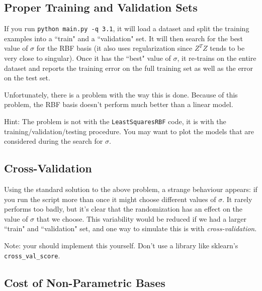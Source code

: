 \documentclass{article}
\begin{document}
\subsection{Proper Training and Validation Sets}

If you run \verb|python main.py -q 3.1|, it will load a dataset and split the training examples
 into a ``train" and a ``validation" set. It will then search for the best value of $\sigma$ 
 for the RBF basis (it also uses regularization since $Z^TZ$ tends to be very close to singular).
  Once it has the ``best" value of $\sigma$, it re-trains on the entire dataset and reports the 
  training error on the full training set as well as the error on the test set.

Unfortunately, there is a problem with the way this is done. Because of this problem, 
the RBF basis doesn't perform much better than a linear model. 

Hint: The problem is not with the \texttt{LeastSquaresRBF} code, it is with the
training/validation/testing procedure.
You may want to plot the models that are considered during the search for $\sigma$.


\subsection{Cross-Validation}

Using the standard solution to the above problem, a strange behaviour appears: 
if you run the script more than once it might choose different values of $\sigma$. 
It rarely performs too badly, but it's clear that the randomization has an effect 
on the value of $\sigma$ that we choose. This variability would be reduced if we
had a larger ``train" and ``validation" set, and one way to simulate this is 
with \emph{cross-validation}. 

Note: your should implement this yourself. Don't use a library like sklearn's \verb|cross_val_score|.

\subsection{Cost of Non-Parametric Bases}
\end{document}
